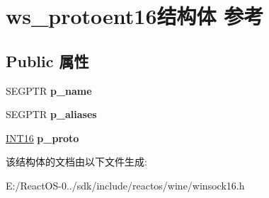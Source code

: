 \hypertarget{structws__protoent16}{}\section{ws\+\_\+protoent16结构体 参考}
\label{structws__protoent16}
\subsection*{Public 属性}
\begin{DoxyCompactItemize}
\item 
\mbox{\label{structws__protoent16_a786d496ff8452a2b3af83231c6281d9f}} 
S\+E\+G\+P\+TR {\bfseries p\+\_\+name}
\item 
\mbox{\label{structws__protoent16_a5e2d78d210937940001a79f203d28dbc}} 
S\+E\+G\+P\+TR {\bfseries p\+\_\+aliases}
\item 
\mbox{\label{structws__protoent16_aa0764ebb3d692f838193ca4f73e89de2}} 
\hyperlink{_processor_bind_8h_a30f500129d8c688af07726d5d34ce52d}{I\+N\+T16} {\bfseries p\+\_\+proto}
\end{DoxyCompactItemize}


该结构体的文档由以下文件生成\+:\begin{DoxyCompactItemize}
\item 
E\+:/\+React\+O\+S-\/0../sdk/include/reactos/wine/winsock16.\+h\end{DoxyCompactItemize}
